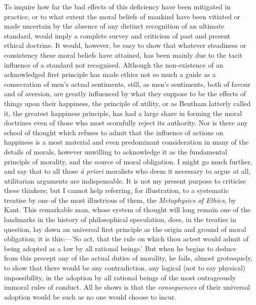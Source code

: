 \documentclass[12pt]{report}
\begin{document}
To inquire how far the bad effects of this deficiency have been mitigated in practice, or to what extent the moral beliefs of mankind have been vitiated or made uncertain by the absence of any distinct recognition of an ultimate standard, would imply a complete survey and criticism of past and present ethical doctrine. It would, however, be easy to show that whatever steadiness or consistency these moral beliefs have attained, has been mainly due to the tacit influence of a standard not recognised. Although the non-existence of an acknowledged first principle has made ethics not so much a guide as a consecration of men's actual sentiments, still, as men's sentiments, both of favour and of aversion, are greatly influenced by what they suppose to be the effects of things upon their happiness, the principle of utility, or as Bentham latterly called it, the greatest happiness principle, has had a large share in forming the moral doctrines even of those who most scornfully reject its authority. Nor is there any school of thought which refuses to admit that the influence of actions on happiness is a most material and even predominant consideration in many of the details of morals, however unwilling to acknowledge it as the fundamental principle of morality, and the source of moral obligation. I might go much further, and say that to all those \emph{à priori} moralists who deem it necessary to argue at all, utilitarian arguments are indispensable. It is not my present purpose to criticise these thinkers; but I cannot help referring, for illustration, to a systematic treatise by one of the most illustrious of them, the \emph{Metaphysics of Ethics}, by Kant. This remarkable man, whose system of thought will long remain one of the landmarks in the history of philosophical speculation, does, in the treatise in question, lay down an universal first principle as the origin and ground of moral obligation; it is this:—'So act, that the rule on which thou actest would admit of being adopted as a law by all rational beings.' But when he begins to deduce from this precept any of the actual duties of morality, he fails, almost grotesquely, to show that there would be any contradiction, any logical (not to say physical) impossibility, in the adoption by all rational beings of the most outrageously immoral rules of conduct. All he shows is that the \emph{consequences} of their universal adoption would be such as no one would choose to incur.
\end{document}
